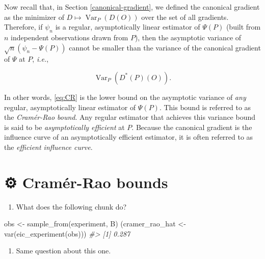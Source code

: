 \documentclass[
  11pt,
  openright,twoside]{book}
\newenvironment{Shaded}{\begin{snugshade}}{\end{snugshade}}
\newcommand{\CommentTok}[1]{\textcolor[rgb]{0.56,0.35,0.01}{\textit{#1}}}
\newcommand{\FunctionTok}[1]{\textcolor[rgb]{0.00,0.00,0.00}{#1}}
\newcommand{\NormalTok}[1]{#1}
\newcommand{\OtherTok}[1]{\textcolor[rgb]{0.56,0.35,0.01}{#1}}
\providecommand{\tightlist}{%
  \setlength{\itemsep}{0pt}\setlength{\parskip}{0pt}}
\DeclareMathOperator{\Var}{Var}
\newcommand{\gear}{\usebox{\gearbox}\;}
\theoremstyle{definition}
\theoremstyle{definition}
\theoremstyle{definition}
\theoremstyle{definition}
\theoremstyle{remark}
\begin{document}
Now recall that, in Section \ref{canonical-gradient}, we defined the
canonical gradient as the minimizer of \(D \mapsto \Var_{P}(D(O))\) over the set
of all gradients. Therefore, if \(\psi_{n}\) is a regular, asymptotically linear
estimator of \(\Psi(P)\) (built from \(n\) independent observations drawn from
\(P\)), then the asymptotic variance of \(\sqrt{n} (\psi_{n} - \Psi(P))\) cannot
be smaller than the variance of the canonical gradient of \(\Psi\) at \(P\),
\emph{i.e.},

\begin{equation}
\label{eq:CR}\Var_{P}(D^{*}(P)(O)). 
\end{equation}

In other words, \eqref{eq:CR} is the lower bound on the asymptotic variance of
\emph{any} regular, asymptotically linear estimator of \(\Psi(P)\). This bound is
referred to as the \emph{Cramér-Rao bound}. Any regular estimator that achieves
this variance bound is said to be \emph{asymptotically efficient} at \(P\). Because
the canonical gradient is the influence curve of an asymptotically efficient
estimator, it is often referred to as the \emph{efficient influence curve}.

\hypertarget{exo-cramer-rao}{%
\section{\texorpdfstring{⚙ \gear Cramér-Rao bounds}{⚙ Cramér-Rao bounds}}\label{exo-cramer-rao}}

\begin{enumerate}
\def\labelenumi{\arabic{enumi}.}
\tightlist
\item
  What does the following chunk do?
\end{enumerate}

\begin{Shaded}
\begin{Highlighting}[]
\NormalTok{obs }\OtherTok{\textless{}{-}} \FunctionTok{sample\_from}\NormalTok{(experiment, B)}
\NormalTok{(cramer\_rao\_hat }\OtherTok{\textless{}{-}} \FunctionTok{var}\NormalTok{(}\FunctionTok{eic\_experiment}\NormalTok{(obs)))}
\CommentTok{\#\textgreater{} [1] 0.287}
\end{Highlighting}
\end{Shaded}

\begin{enumerate}
\def\labelenumi{\arabic{enumi}.}
\setcounter{enumi}{1}
\tightlist
\item
  Same question about this one.
\end{enumerate}
\end{document}
